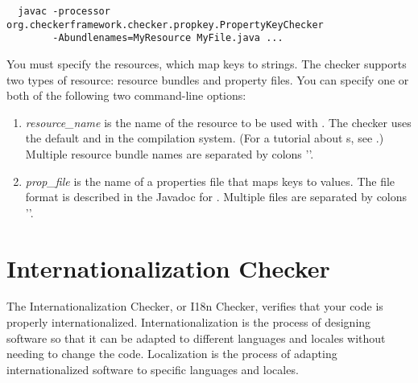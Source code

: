 \begin{Verbatim}
  javac -processor org.checkerframework.checker.propkey.PropertyKeyChecker
        -Abundlenames=MyResource MyFile.java ...
\end{Verbatim}

You must specify the resources, which map keys to strings.
The checker supports two types of resource:
resource bundles and property files.  You can specify one or both of the
following two command-line options:

\begin{enumerate}

\item {}

  \emph{resource\_name} is the name of the resource to be used with
  .
  The checker uses the default  and  in the
  compilation system.
  (For a tutorial about s, see
  .)
  Multiple resource bundle names are separated by colons '\code{:}'.

\item {}

  \emph{prop\_file} is the name of a properties file that maps
  keys to values.  The file format is described in
  the Javadoc for 
  .
  Multiple files are separated by colons '\code{:}'.

\end{enumerate}



\section{Internationalization Checker\label{i18n-checker}}

The Internationalization Checker, or I18n Checker, verifies that your code is properly
internationalized.  Internationalization is the process of designing software so that
it can be adapted to different languages and locales without needing to change the code.
Localization is the process of adapting internationalized software to specific languages
and locales.

